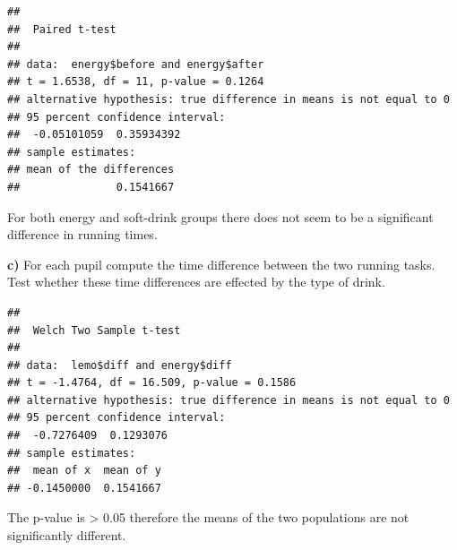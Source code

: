 \documentclass[
]{article}
\newenvironment{Shaded}{\begin{snugshade}}{\end{snugshade}}
\newcommand{\AttributeTok}[1]{\textcolor[rgb]{0.77,0.63,0.00}{#1}}
\newcommand{\CommentTok}[1]{\textcolor[rgb]{0.56,0.35,0.01}{\textit{#1}}}
\newcommand{\ConstantTok}[1]{\textcolor[rgb]{0.00,0.00,0.00}{#1}}
\newcommand{\FunctionTok}[1]{\textcolor[rgb]{0.00,0.00,0.00}{#1}}
\newcommand{\NormalTok}[1]{#1}
\newcommand{\OtherTok}[1]{\textcolor[rgb]{0.56,0.35,0.01}{#1}}
\newcommand{\SpecialCharTok}[1]{\textcolor[rgb]{0.00,0.00,0.00}{#1}}
\newcommand{\StringTok}[1]{\textcolor[rgb]{0.31,0.60,0.02}{#1}}
\begin{document}
\begin{Shaded}
\end{Shaded}

\begin{verbatim}
## 
##  Paired t-test
## 
## data:  energy$before and energy$after
## t = 1.6538, df = 11, p-value = 0.1264
## alternative hypothesis: true difference in means is not equal to 0
## 95 percent confidence interval:
##  -0.05101059  0.35934392
## sample estimates:
## mean of the differences 
##               0.1541667
\end{verbatim}

For both energy and soft-drink groups there does not seem to be a
significant difference in running times.

\textbf{c)} For each pupil compute the time difference between the two
running tasks. Test whether these time differences are effected by the
type of drink.

\begin{Shaded}
\end{Shaded}

\begin{verbatim}
## 
##  Welch Two Sample t-test
## 
## data:  lemo$diff and energy$diff
## t = -1.4764, df = 16.509, p-value = 0.1586
## alternative hypothesis: true difference in means is not equal to 0
## 95 percent confidence interval:
##  -0.7276409  0.1293076
## sample estimates:
##  mean of x  mean of y 
## -0.1450000  0.1541667
\end{verbatim}

The p-value is \textgreater{} 0.05 therefore the means of the two
populations are not significantly different.
\end{document}
